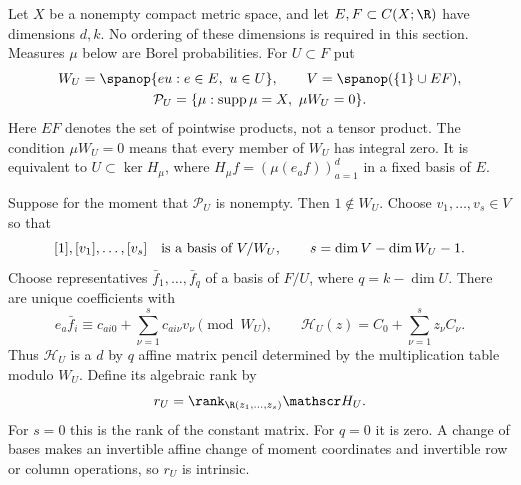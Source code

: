 Let $X$ be a nonempty compact metric space, and let $E,F\subset C(X;\R)$
have dimensions $d,k$. No ordering of these dimensions is required in
this section. Measures $\mu$ below are Borel probabilities. For $U\subset F$ put
\begin{equation}\label{eq:kernel-product-spaces}
 \begin{gathered}
 W_U=\spanop\{eu:e\in E,\ u\in U\},\qquad
 V=\spanop(\{1\}\cup EF),\\
 \mathcal P_U=\{\mu:\operatorname{supp}\mu=X,\ \mu W_U=0\}.
 \end{gathered}
\end{equation}
Here $EF$ denotes the set of pointwise products, not a tensor product.
The condition $\mu W_U=0$ means that every member of $W_U$ has integral
zero. It is equivalent to $U\subset\ker H_\mu$, where
$H_\mu f=(\mu(e_a f))_{a=1}^d$ in a fixed basis of $E$.

Suppose for the moment that $\mathcal P_U$ is nonempty. Then
$1\notin W_U$. Choose $v_1,\ldots,v_s\in V$ so that
\[
 [1],[v_1],\ldots,[v_s]\quad\hbox{is a basis of }V/W_U,
 \qquad s=\dim V-\dim W_U-1.
\]
Choose representatives $\bar f_1,\ldots,\bar f_q$ of a basis of $F/U$,
where $q=k-\dim U$. There are unique coefficients with
\begin{equation}\label{eq:kernel-pencil}
 e_a\bar f_i\equiv c_{ai0}+\sum_{\nu=1}^s c_{ai\nu}v_\nu
       \pmod {W_U},\qquad
 \mathscr H_U(z)=C_0+\sum_{\nu=1}^s z_\nu C_\nu.
\end{equation}
Thus $\mathscr H_U$ is a $d$ by $q$ affine matrix pencil determined by
the multiplication table modulo $W_U$. Define its algebraic rank by
\begin{equation}\label{eq:kernel-generic-rank}
 r_U=\rank_{\R(z_1,\ldots,z_s)}\mathscr H_U.
\end{equation}
For $s=0$ this is the rank of the constant matrix. For $q=0$ it is zero.
A change of bases makes an invertible affine change of moment coordinates
and invertible row or column operations, so $r_U$ is intrinsic.

